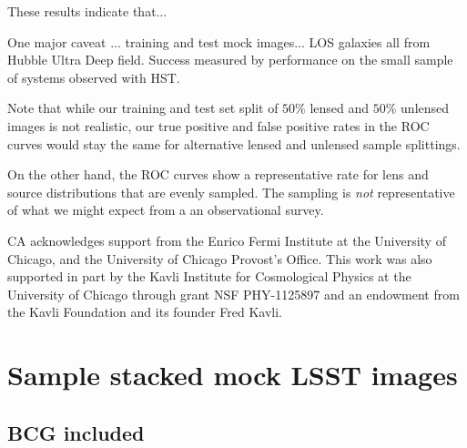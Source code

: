 \documentclass{emulateapj}
\begin{document}
These results indicate that...

One major caveat ... training and test mock images... LOS galaxies all
from Hubble Ultra Deep field.  Success measured by performance on the
small sample of systems observed with HST.

Note that while our training and test set split of $50\%$ lensed and
$50\%$ unlensed images is not realistic, our true positive and false
positive rates in the ROC curves would stay the same for alternative
lensed and unlensed sample splittings.  

On the other hand, the ROC curves show a representative rate for lens
and source distributions that are evenly sampled.  The sampling is
{\it not} representative of what we might expect from a an
observational survey.


\acknowledgments CA acknowledges support from the Enrico Fermi
Institute at the University of Chicago, and the University of Chicago
Provost's Office. This work was also supported in part by the Kavli
Institute for Cosmological Physics at the University of Chicago
through grant NSF PHY-1125897 and an endowment from the Kavli
Foundation and its founder Fred Kavli.
\lastpagefootnotes


\appendix
\section{Sample stacked mock LSST images}
\subsection{BCG included}


\end{document}
